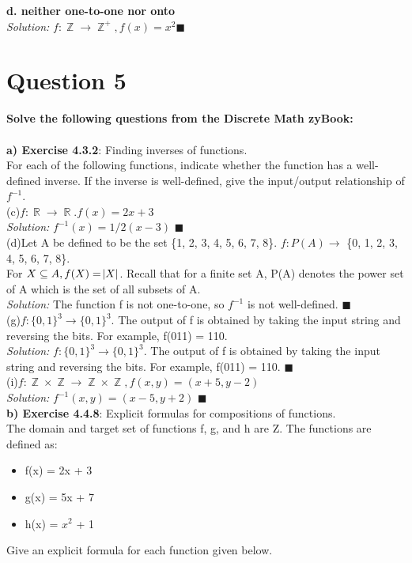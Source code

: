 \documentclass[11pt]{article}
\DeclareMathOperator*{\R}{\mathbb{R}}\relax
\DeclareMathOperator*{\Z}{\mathbb{Z}}\relax
\begin{document}
		\textbf{d. neither one-to-one nor onto} \\
		\textit{Solution: }
		$f: \Z \rightarrow \Z^+, f(x) = x^2 \blacksquare$
	
	\newpage
	\section*{Question 5}
	\textbf{Solve the following questions from the Discrete Math zyBook:}\\
	\\
		\textbf{a) Exercise 4.3.2}: Finding inverses of functions.\\	
		For each of the following functions, indicate whether the function has a well-defined inverse. 
		If the inverse is well-defined, give the input/output relationship of $f^{-1}$.\\
		
		(c)$f: \R \rightarrow \R. f(x) = 2x + 3$ \\
		\textit{Solution: }
		$f^{-1} (x)= {1/2}(x-3)$ $\blacksquare$\\
		
		(d)Let A be defined to be the set \{1, 2, 3, 4, 5, 6, 7, 8\}. $f: P(A) \rightarrow$ \{0, 1, 2, 3, 4, 5, 6, 7, 8\}. \\
		For $X \subseteq A, f(X) = \abs{X}$. Recall that for a finite set A, P(A) denotes the power set of A which is the set of all subsets of A. \\
		\textit{Solution: }
		The function f is not one-to-one, so $f^{-1}$ is not well-defined. $\blacksquare$\\
		
		(g)$f: \{0, 1\}^3\rightarrow\{0, 1\}^3$. The output of f is obtained by taking the input string and reversing the bits. For example, f(011) = 110. \\
		\textit{Solution: }
		$f: \{0, 1\}^3\rightarrow\{0, 1\}^3$. The output of f is obtained by taking the input string and reversing the bits. For example, f(011) = 110. $\blacksquare$ \\

		(i)$f: \Z \times \Z \rightarrow \Z \times \Z, f(x, y) = (x+5, y-2)$ \\
		\textit{Solution: }
		$f^{-1}(x, y) = (x-5, y+2)$ $\blacksquare$ \\
		
		\textbf{b) Exercise 4.4.8}: Explicit formulas for compositions of functions.\\	
		The domain and target set of functions f, g, and h are Z. The functions are defined as:
		\begin{itemize}
			\item f(x) = 2x + 3
			\item g(x) = 5x + 7
			\item h(x) = $x^2$ + 1
		\end{itemize}
		Give an explicit formula for each function given below.
		
\end{document}
